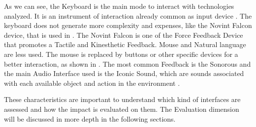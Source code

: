 	
 	\begin{figure}[h] 
   	    \captionsetup{width=12cm}%
	\end{figure}


As we can see, the Keyboard is the main mode to interact with technologies analyzed. It is an instrument of interaction already common as input device \cite{Sanchez2004}. The keyboard does not generate more complexity and expenses, like the Novint Falcon device, that is used in \cite{Sanchez2014a}. The Novint Falcon is one of the Force Feedback Device that promotes a Tactile and Kinesthetic Feedback. Mouse and Natural language are less used. The mouse is replaced by buttons or other specific devices for a better interaction, as shown in \cite{Shafiq2014}. The most common Feedback is the Sonorous and the main Audio Interface used is the Iconic Sound, which are sounds associated with each available object and action in the environment \cite{Sanchez2014a}.

These characteristics are important to understand which kind of interfaces are assessed and how the impact is evaluated on them. The Evaluation dimension will be discussed in more depth in the following sections.

